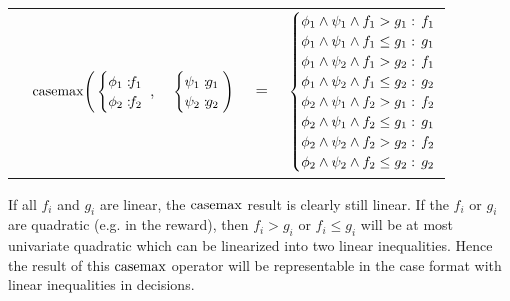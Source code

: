 {\footnotesize
\begin{center}
\begin{tabular}{r c c c l}
&
\hspace{-7mm} $\casemax \Bigg(
  \begin{cases}
    \phi_1: \hspace{-2mm} & \hspace{-2mm} f_1 \\ 
    \phi_2: \hspace{-2mm} & \hspace{-2mm} f_2 \\ 
  \end{cases}$
$,$
&
\hspace{-4mm}
  $\begin{cases}
    \psi_1: \hspace{-2mm} & \hspace{-2mm} g_1 \\ 
    \psi_2: \hspace{-2mm} & \hspace{-2mm} g_2 \\ 
  \end{cases} \Bigg)$
&
\hspace{-4mm} 
$ = $
&
\hspace{-4mm}
  $\begin{cases}
  \phi_1 \wedge \psi_1 \wedge f_1 > g_1    : & \hspace{-2mm} f_1 \\ 
  \phi_1 \wedge \psi_1 \wedge f_1 \leq g_1 : & \hspace{-2mm} g_1 \\ 
  \phi_1 \wedge \psi_2 \wedge f_1 > g_2    : & \hspace{-2mm}f_1 \\ 
  \phi_1 \wedge \psi_2 \wedge f_1 \leq g_2 : & \hspace{-2mm} g_2 \\ 
 \phi_2 \wedge \psi_1 \wedge f_2 > g_1    : & \hspace{-2mm} f_2 \\ 
 \phi_2 \wedge \psi_1 \wedge f_2 \leq g_1 : & \hspace{-2mm} g_1 \\ 
 \phi_2 \wedge \psi_2 \wedge f_2 > g_2    : & \hspace{-2mm} f_2 \\ 
 \phi_2 \wedge \psi_2 \wedge f_2 \leq g_2 : & \hspace{-2mm} g_2 \\ 
  \end{cases}$
\end{tabular}
\end{center}
} If all $f_i$ and $g_i$ are linear,
the $\mathrm{casemax}$ result is clearly still linear.  If the $f_i$ or $g_i$
are quadratic (e.g. in the reward), then $f_i > g_i$ or $f_i \leq
g_i$ will be at most univariate quadratic which can be linearized into two linear inequalities. Hence the result of this $\mathrm{casemax}$
operator will be representable in the case format with linear inequalities in decisions.

